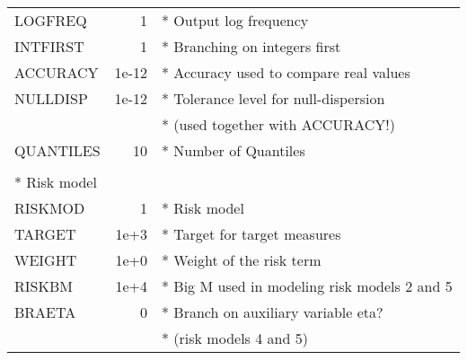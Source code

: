 \documentclass[11pt,draft]{article}
\newcommand{\+}{{\ti{+}}}
\newcommand{\1}{{\ti{1}}}
\begin{document}
\begin{appendix}
\begin{center}
{\begin{tabular}{lrl}
LOGFREQ            &  1 & * Output log frequency\\
INTFIRST       &      1 & * Branching on integers first\\
ACCURACY       &     1e-12& * Accuracy used to compare real values\\
NULLDISP        &     1e-12 & * Tolerance level for null-dispersion\\&&* (used together with ACCURACY!)\\
QUANTILES      &    10 &* Number of Quantiles\\\medskip\\
\multicolumn{3}{l}{* Risk model}\medskip\\
RISKMOD   &             1 & * Risk model\\
TARGET    &        1e+3 & * Target for target measures\\
WEIGHT   &         1e+0 & * Weight of the risk term\medskip\\
RISKBM   &         1e+4 & * Big M used in modeling risk models 2 and 5\\
BRAETA   &            0 & * Branch on auxiliary variable eta?\\&& * (risk models 4 and 5)\\
\end{tabular}}
\\
\end{center}
\end{appendix}
\end{document}
